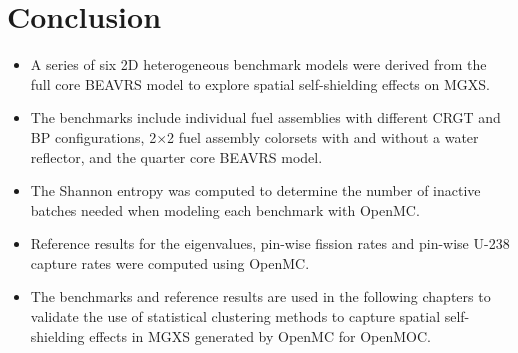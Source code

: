 \section{Conclusion}
\label{sec:ls-conclusion}




\vfill
\begin{highlightsbox}[frametitle=Highlights]
\begin{itemize}
  \item A series of six 2D heterogeneous benchmark models were derived from the full core \ac{BEAVRS} model to explore spatial self-shielding effects on \ac{MGXS}.
  \item The benchmarks include individual fuel assemblies with different \ac{CRGT} and \ac{BP} configurations, 2$\times$2 fuel assembly colorsets with and without a water reflector, and the quarter core \ac{BEAVRS} model.
  \item The Shannon entropy was computed to determine the number of inactive batches needed when modeling each benchmark with OpenMC.
  \item Reference results for the eigenvalues, pin-wise fission rates and pin-wise U-238 capture rates were computed using OpenMC.
  \item The benchmarks and reference results are used in the following chapters to validate the use of statistical clustering methods to capture spatial self-shielding effects in \ac{MGXS} generated by OpenMC for OpenMOC.
\end{itemize}
\end{highlightsbox}
\vfill